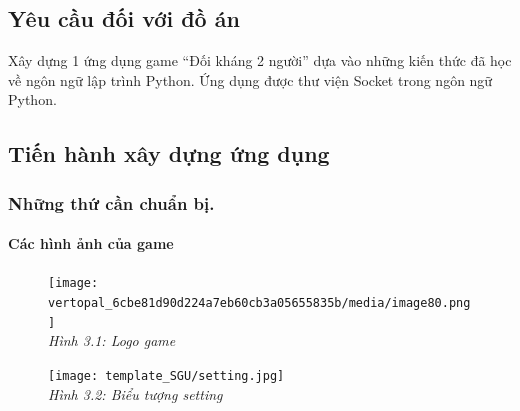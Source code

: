 \documentclass[a4paper]{article}
\begin{document}
\hypertarget{yuxeau-cux1ea7u-ux111ux1ed1i-vux1edbi-ux111ux1ed3-uxe1n}{%
\subsection{\texorpdfstring{Yêu cầu đối với đồ án
}{Yêu cầu đối với đồ án }}\label{yuxeau-cux1ea7u-ux111ux1ed1i-vux1edbi-ux111ux1ed3-uxe1n}}

Xây dựng 1 ứng dụng game ``Đối kháng 2 người'' dựa vào những kiến thức đã học
về ngôn ngữ lập trình Python. Ứng dụng được thư viện Socket trong ngôn
ngữ Python.

\hypertarget{tiux1ebfn-huxe0nh-xuxe2y-dux1ef1ng-ux1ee9ng-dux1ee5ng}{%
\subsection{\texorpdfstring{Tiến hành xây dựng ứng dụng
}{Tiến hành xây dựng ứng dụng }}\label{tiux1ebfn-huxe0nh-xuxe2y-dux1ef1ng-ux1ee9ng-dux1ee5ng}}

\hypertarget{nhux1eefng-thux1ee9-cux1ea7n-chuux1ea9n-bux1ecb.}{%
\subsubsection{Những thứ cần chuẩn
bị.}\label{nhux1eefng-thux1ee9-cux1ea7n-chuux1ea9n-bux1ecb.}}

\hypertarget{cuxe1c-huxecnh-ux1ea3nh-cux1ee7a-game}{%
\paragraph{Các hình ảnh của
game}\label{cuxe1c-huxecnh-ux1ea3nh-cux1ee7a-game}}
\vspace{0.5cm}


\begin{figure}

    \centering
            \texttt{[image: vertopal\_6cbe81d90d224a7eb60cb3a05655835b/media/image80.png]}
            \\
    \emph{Hình 3.1: Logo game}

\end{figure}


\begin{figure}
    \centering

\texttt{[image: template\_SGU/setting.jpg]}
\\
    \centering \emph{Hình 3.2: Biểu tượng setting}
\end{figure}
\end{document}
